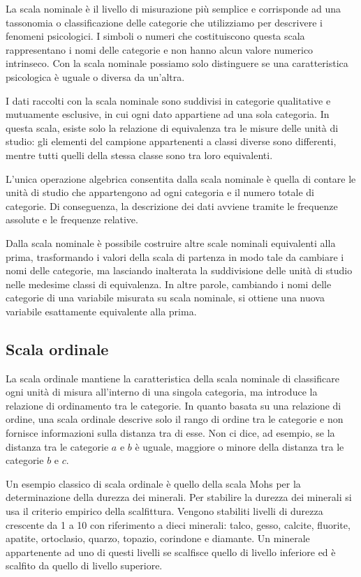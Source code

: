 \documentclass[
  letterpaper,
]{krantz}
\begin{document}
La scala nominale è il livello di misurazione più semplice e corrisponde
ad una tassonomia o classificazione delle categorie che utilizziamo per
descrivere i fenomeni psicologici. I simboli o numeri che costituiscono
questa scala rappresentano i nomi delle categorie e non hanno alcun
valore numerico intrinseco. Con la scala nominale possiamo solo
distinguere se una caratteristica psicologica è uguale o diversa da
un'altra.

I dati raccolti con la scala nominale sono suddivisi in categorie
qualitative e mutuamente esclusive, in cui ogni dato appartiene ad una
sola categoria. In questa scala, esiste solo la relazione di equivalenza
tra le misure delle unità di studio: gli elementi del campione
appartenenti a classi diverse sono differenti, mentre tutti quelli della
stessa classe sono tra loro equivalenti.

L'unica operazione algebrica consentita dalla scala nominale è quella di
contare le unità di studio che appartengono ad ogni categoria e il
numero totale di categorie. Di conseguenza, la descrizione dei dati
avviene tramite le frequenze assolute e le frequenze relative.

Dalla scala nominale è possibile costruire altre scale nominali
equivalenti alla prima, trasformando i valori della scala di partenza in
modo tale da cambiare i nomi delle categorie, ma lasciando inalterata la
suddivisione delle unità di studio nelle medesime classi di equivalenza.
In altre parole, cambiando i nomi delle categorie di una variabile
misurata su scala nominale, si ottiene una nuova variabile esattamente
equivalente alla prima.

\subsection{Scala ordinale}\label{scala-ordinale}

La scala ordinale mantiene la caratteristica della scala nominale di
classificare ogni unità di misura all'interno di una singola categoria,
ma introduce la relazione di ordinamento tra le categorie. In quanto
basata su una relazione di ordine, una scala ordinale descrive solo il
rango di ordine tra le categorie e non fornisce informazioni sulla
distanza tra di esse. Non ci dice, ad esempio, se la distanza tra le
categorie \(a\) e \(b\) è uguale, maggiore o minore della distanza tra
le categorie \(b\) e \(c\).

Un esempio classico di scala ordinale è quello della scala Mohs per la
determinazione della durezza dei minerali. Per stabilire la durezza dei
minerali si usa il criterio empirico della scalfittura. Vengono
stabiliti livelli di durezza crescente da 1 a 10 con riferimento a dieci
minerali: talco, gesso, calcite, fluorite, apatite, ortoclasio, quarzo,
topazio, corindone e diamante. Un minerale appartenente ad uno di questi
livelli se scalfisce quello di livello inferiore ed è scalfito da quello
di livello superiore.
\end{document}
